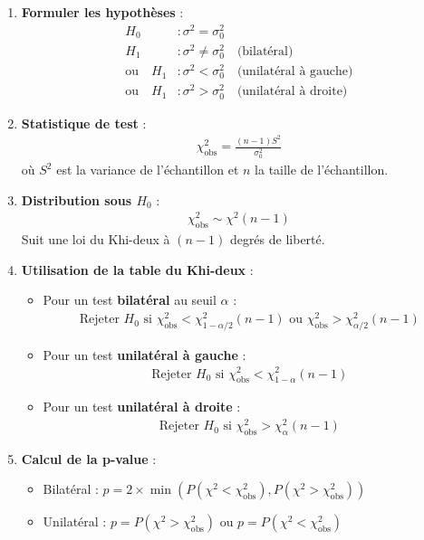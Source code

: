 \documentclass[11pt,a4paper]{article}
\newcommand{\chideux}{\chi^2}
\begin{document}
\begin{enumerate}
    \item \textbf{Formuler les hypothèses} :
    \begin{align*}
    H_0 &: \sigma^2 = \sigma_0^2 \\
    H_1 &: \sigma^2 \neq \sigma_0^2 \quad \text{(bilatéral)} \\
    \text{ou} \quad H_1 &: \sigma^2 < \sigma_0^2 \quad \text{(unilatéral à gauche)} \\
    \text{ou} \quad H_1 &: \sigma^2 > \sigma_0^2 \quad \text{(unilatéral à droite)}
    \end{align*}
    
    \item \textbf{Statistique de test} :
    \begin{align*}
    \chideux_{\text{obs}} = \frac{(n-1)S^2}{\sigma_0^2}
    \end{align*}
    où $S^2$ est la variance de l'échantillon et $n$ la taille de l'échantillon.
    
    \item \textbf{Distribution sous $H_0$} :
    \begin{align*}
    \chideux_{\text{obs}} \sim \chideux(n-1)
    \end{align*}
    Suit une loi du Khi-deux à $(n-1)$ degrés de liberté.
    
    \item \textbf{Utilisation de la table du Khi-deux} :
    \begin{itemize}
        \item Pour un test \textbf{bilatéral} au seuil $\alpha$ :
        \begin{align*}
        \text{Rejeter } H_0 \text{ si } \chideux_{\text{obs}} < \chideux_{1-\alpha/2}(n-1) \text{ ou } \chideux_{\text{obs}} > \chideux_{\alpha/2}(n-1)
        \end{align*}
        \item Pour un test \textbf{unilatéral à gauche} :
        \begin{align*}
        \text{Rejeter } H_0 \text{ si } \chideux_{\text{obs}} < \chideux_{1-\alpha}(n-1)
        \end{align*}
        \item Pour un test \textbf{unilatéral à droite} :
        \begin{align*}
        \text{Rejeter } H_0 \text{ si } \chideux_{\text{obs}} > \chideux_{\alpha}(n-1)
        \end{align*}
    \end{itemize}
    
    \item \textbf{Calcul de la p-value} :
    \begin{itemize}
        \item Bilatéral : $p = 2 \times \min(P(\chideux < \chideux_{\text{obs}}), P(\chideux > \chideux_{\text{obs}}))$
        \item Unilatéral : $p = P(\chideux > \chideux_{\text{obs}})$ ou $p = P(\chideux < \chideux_{\text{obs}})$
    \end{itemize}
\end{enumerate}
\end{document}
